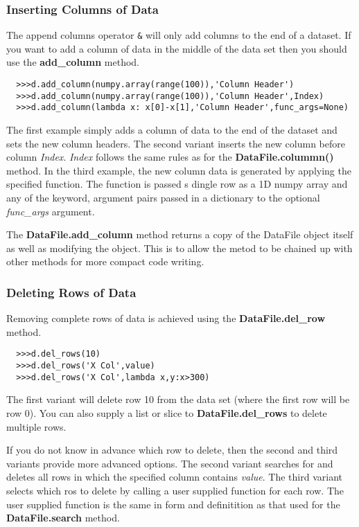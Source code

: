 \documentclass[a4paper,11pt]{scrartcl}
\begin{document}
\subsubsection{Inserting Columns of Data}

The append columns operator \verb#&# will only add columns to the end of a dataset. If you want to add a column of data in the middle of the data set then you should use the \textbf{add\_column} method.

\begin{verbatim}
  >>>d.add_column(numpy.array(range(100)),'Column Header')
  >>>d.add_column(numpy.array(range(100)),'Column Header',Index)
  >>>d.add_column(lambda x: x[0]-x[1],'Column Header',func_args=None)
\end{verbatim}

The first example simply adds a column of data to the end of the dataset and sets the new column headers. The second variant  inserts the new column before column \textit{Index}. \textit{Index} follows the same rules as for the \textbf{DataFile.colummn()} method. In the third example, the new column data is generated by applying the specified function. The function is passed s dingle row as a 1D numpy array and any of the keyword, argument pairs passed in a dictionary to the optional \textit{func\_args} argument.

The \textbf{DataFile.add\_column} method returns a copy of the DataFile object itself as well as modifying the object. This is to allow the metod to be chained up with other methods for more compact code writing.

\subsubsection{Deleting Rows of Data}

Removing complete rows of data is achieved using the \textbf{DataFile.del\_row} method.

\begin{verbatim}
  >>>d.del_rows(10)
  >>>d.del_rows('X Col',value)
  >>>d.del_rows('X Col',lambda x,y:x>300)
\end{verbatim}

The first variant will delete row 10 from the data set (where the first row will be row 0). You can also supply a list or slice to \textbf{DataFile.del\_rows} to delete multiple rows.

If you do not know in advance which row to delete, then the second and third variants provide more advanced options. The second variant searches for and deletes all rows in which the specified column contains \textit{value}. The third variant selects which ros to delete by calling a user supplied function for each row. The user supplied function is the same in form and definitition as that used for the \textbf{DataFile.search} method.
\end{document}
